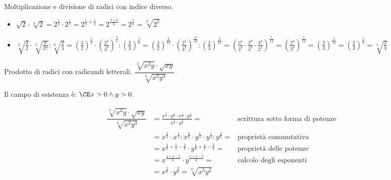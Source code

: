  \begin{esempio}
Moltiplicazione e divisione di radici con indice diverso.
\begin{itemize}
\item $\sqrt 2\cdot \sqrt[3]2=
       2^\frac{1}{2} \cdot 2^\frac{1}{3} = 2^{\frac{1}{2} + \frac{1}{3}} =
       2^{\frac{3+2}{6}} = 2^{\frac{5}{6}} =\sqrt[6]{2^5}$
\item 
  $\sqrt[3]{\frac{3}{2}} \cdot \sqrt[4]{\frac{8}{27}} : \sqrt[6]{\frac{2}{3}}=
   \left(\frac{3}{2}\right)^{\frac{1}{3}} \cdot 
   \left(\frac{2^3}{3^3}\right)^{\frac{1}{4}} : 
   \left(\frac{2}{3}\right)^{\frac{1}{6}}=
   \left(\frac{3}{2}\right)^{\frac{4}{12}} \cdot 
   \left(\frac{2^3}{3^3}\right)^{\frac{3}{12}} : 
   \left(\frac{2}{3}\right)^{\frac{2}{12}}=
   \left(\frac{3^4}{2^4} \cdot 
   \frac{2^9}{3^9} \cdot 
   \frac{3^2}{2^2}\right)^{\frac{1}{12}}=
   \left(\frac{2^3}{3^3}\right)^{\frac{1}{12}}=
   \left(\frac{2}{3}\right)^{\frac{3}{12}}=
   \left(\frac{2}{3}\right)^{\frac{1}{4}}=\sqrt[4]{\frac 2 3}$
\end{itemize}
 \end{esempio}

\begin{esempio}
Prodotto di radici con radicandi letterali.
 $\dfrac{\sqrt[3]{x^2y}\cdot \sqrt{xy}}{\sqrt[6]{x^2y^3}}$
 
 Il campo di esistenza è: $\CE x>0\wedge y>0$.
 
\begin{align*}
\dfrac{\sqrt[3]{x^2y}\cdot \sqrt{xy}}{\sqrt[6]{x^2y^3}} &=
\frac{{x^\frac{2}{3} \cdot y^\frac{1}{3}} \cdot 
       x^\frac{1}{2} \cdot y^\frac{1}{2}}
     {x^\frac{2}{6} \cdot y^\frac{3}{6}} =
         & \mbox{scrittura sotto forma di potenze}\\
    &=x^\frac{2}{3} \cdot x^\frac{1}{2} : x^\frac{2}{6} \cdot 
      y^\frac{1}{3} \cdot y^\frac{1}{2} : y^\frac{3}{6}=
         & \mbox{proprietà commutativa} \\
    &=x^{\frac{2}{3} + \frac{1}{2} - \frac{2}{6}} \cdot 
      y^{\frac{1}{3} + \frac{1}{2} - \frac{3}{6}}= 
         & \mbox{proprietà delle potenze}\\
    &=x^{\frac{4+3-2}{6}} \cdot y^{\frac{2+3-3}{6}}=
         & \mbox{calcolo degli esponenti} \\
    &=x^{\frac{5}{6}} \cdot y^{\frac{2}{6}}=
    \sqrt[6]{x^5y^2}
\end{align*}

\end{esempio}

